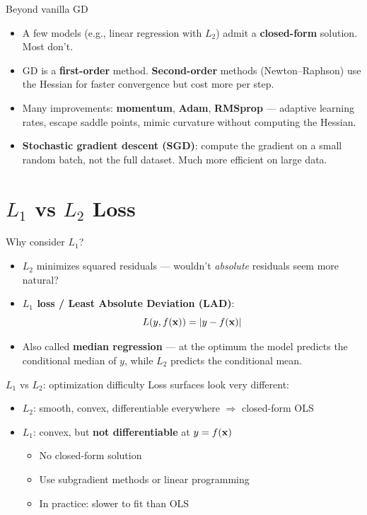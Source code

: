\documentclass[aspectratio=169]{beamer}
\begin{document}
\begin{frame}{Beyond vanilla GD}
  \begin{itemize}
    \item A few models (e.g., linear regression with $L_2$) admit a \textbf{closed-form} solution. Most don't.
    \item GD is a \textbf{first-order} method. \textbf{Second-order} methods (Newton–Raphson) use the Hessian for faster convergence but cost more per step.
    \item Many improvements: \textbf{momentum}, \textbf{Adam}, \textbf{RMSprop} — adaptive learning rates, escape saddle points, mimic curvature without computing the Hessian.
    \item \textbf{Stochastic gradient descent (SGD)}: compute the gradient on a small random batch, not the full dataset. Much more efficient on large data.
  \end{itemize}
\end{frame}

\section{\texorpdfstring{$L_1$}{L1} vs \texorpdfstring{$L_2$}{L2} Loss}

\begin{frame}{Why consider $L_1$?}
  \begin{itemize}
    \item $L_2$ minimizes squared residuals — wouldn't \emph{absolute} residuals seem more natural?
    \item \textbf{$L_1$ loss / Least Absolute Deviation (LAD)}:
      \[
        L\!\left(y, f(\mathbf{x})\right) = |y - f(\mathbf{x})|
      \]
    \item Also called \textbf{median regression} — at the optimum the model predicts the conditional median of $y$, while $L_2$ predicts the conditional mean.
  \end{itemize}
\end{frame}

\begin{frame}{$L_1$ vs $L_2$: optimization difficulty}
  Loss surfaces look very different:
  \begin{itemize}
    \item \textbf{$L_2$}: smooth, convex, differentiable everywhere $\Rightarrow$ closed-form OLS
    \item \textbf{$L_1$}: convex, but \textbf{not differentiable} at $y = f(\mathbf{x})$
      \begin{itemize}
        \item No closed-form solution
        \item Use subgradient methods or linear programming
        \item In practice: slower to fit than OLS
      \end{itemize}
  \end{itemize}
\end{frame}
\end{document}
